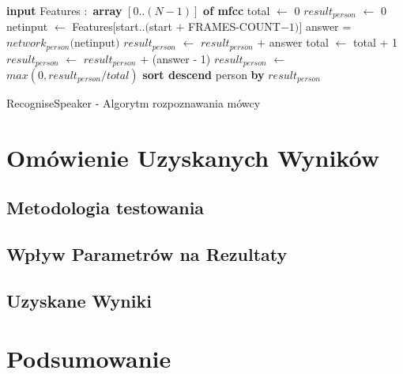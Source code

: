 \documentclass[a4paper]{article}
\begin{document}
		\begin{algorithm}
			\begin{algorithmic}[1]
				\STATE \textbf{input} Features $:$ \textbf{array} $[0 .. (N-1)]$ \textbf{of mfcc}
				\STATE				
				\STATE total $\leftarrow$ 0
					\STATE $result_{person}$ $\leftarrow$ 0
				\ENDFOR
				\STATE
					\STATE {}
					\STATE {}
					\STATE netinput $\leftarrow$ Features$[$start$ .. ($start $+$ FRAMES-COUNT$-1)]$
					\STATE
						\STATE answer = $network_{person}($netinput$)$
								\STATE $result_{person}$ $\leftarrow$ $result_{person}$ $+$ answer
								\STATE total $\leftarrow$ total + 1
							\ELSE
								\STATE $result_{person}$ $\leftarrow$ $result_{person}$ $+$ (answer - 1)
							\ENDIF
							\STATE {}
						\ENDIF	
					\ENDFOR
				\ENDFOR
				\STATE
					\STATE $result_{person}$ $\leftarrow$ $max(0, result_{person} / total)$
				\ENDFOR
				\STATE \textbf{sort descend} person \textbf{by} $result_{person}$
			\end{algorithmic}			
			\caption{RecogniseSpeaker - Algorytm rozpoznawania mówcy}
			\label{alg:recognise}
		\end{algorithm}
	
\section{Omówienie Uzyskanych Wyników}
	\subsection{Metodologia testowania}
	\subsection{Wpływ Parametrów na Rezultaty}
	\subsection{Uzyskane Wyniki}
\section{Podsumowanie}
\end{document}
